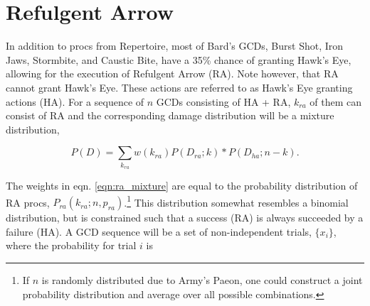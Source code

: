 \newcommand{\drawsequence}[4]{%
  \begin{center}
    \begin{tikzpicture}[scale=0.8]
      \draw[->, thick] (0,0) -- (#1+0.65,0);
      
      \foreach \x in {1,...,#1} {
        \draw[thick] (\x,0.15) -- (\x,-0.15);
      }
      
      \node[left] at (0,1.) {\textbf{Action:}};
      \node[left] at (0,-1) {\textbf{Prob.:}};
      
      \foreach [count=\i] \action in {#2} {
        \node[minimum width=2.0cm, minimum height=0.8cm] at (\i,1.) {\action};
      }
      
      \foreach [count=\i] \prob in {#3} {
        \node at (\i,-1.) {\prob};
      }
      
      \node at (#1+0.75,-1.) {$=$};
      \node at (#1+1.5,-1.) {#4};
    \end{tikzpicture}
  \end{center}
}

\section{Refulgent Arrow}

In addition to procs from Repertoire, most of Bard's GCDs, Burst Shot, Iron Jaws, Stormbite, and Caustic Bite, have a 35\% chance of granting Hawk's Eye, allowing for the execution of Refulgent Arrow (RA). Note however, that RA cannot grant Hawk's Eye. These actions are referred to as Hawk's Eye granting actions (HA). For a sequence of $n$ GCDs consisting of HA + RA, $k_{ra}$ of them can consist of RA and the corresponding damage distribution will be a mixture distribution,

\begin{equation}
  P(D) = \sum_{k_{ra}} w(k_{ra}) P(D_{ra}; k) \ast P(D_{ha}; n - k).
  \label{eqn:ra_mixture}
\end{equation}

The weights in eqn. \ref{eqn:ra_mixture} are equal to the probability distribution of RA procs, $P_{ra}(k_{ra}; n, p_{ra})$.\footnote{If $n$ is randomly distributed due to Army's Paeon, one could construct a joint probability distribution and average over all possible combinations.} This distribution somewhat resembles a binomial distribution, but is constrained such that a success (RA) is always succeeded by a failure (HA). A GCD sequence will be a set of non-independent trials, $\{ x_i \}$, where the probability for trial $i$ is

